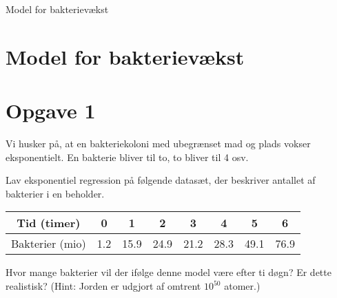 \begin{center}
\Huge
Model for bakterievækst
\end{center}

\section*{Model for bakterievækst}
\section*{Opgave 1}
Vi husker på, at en bakteriekoloni med ubegrænset mad og plads vokser eksponentielt. En bakterie bliver til to, to bliver til 4 osv. 
\begin{enumerate}[label=\roman*)]
\item Lav eksponentiel regression på følgende datasæt, der beskriver antallet af bakterier i en beholder.
\begin{center}
\begin{tabular}{c|c|c|c|c|c|c|c}
Tid (timer) & 0 & 1 & 2 & 3 & 4 & 5 & 6\\ \hline
Bakterier (mio) & 1.2 & 15.9 & 24.9 & 21.2 & 28.3 & 49.1 &  76.9
\end{tabular}
\item Hvor mange bakterier vil der ifølge denne model være efter ti døgn? Er dette realistisk? (Hint: Jorden er udgjort af omtrent $10^{50}$ atomer.)
\end{center}
\end{enumerate}
